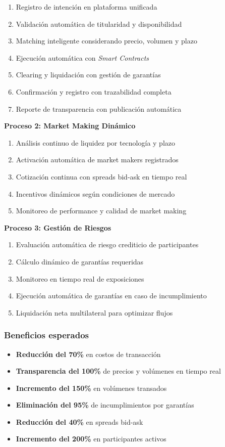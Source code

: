 \documentclass{cel}
\begin{document}
\begin{enumerate}
\item Registro de intención en plataforma unificada
\item Validación automática de titularidad y disponibilidad
\item Matching inteligente considerando precio, volumen y plazo
\item Ejecución automática con \textit{Smart Contracts}
\item Clearing y liquidación con gestión de garantías
\item Confirmación y registro con trazabilidad completa
\item Reporte de transparencia con publicación automática

\end{enumerate}
\textbf{Proceso 2: Market Making Dinámico}


\begin{enumerate}
\item Análisis continuo de liquidez por tecnología y plazo
\item Activación automática de market makers registrados
\item Cotización continua con spreads bid-ask en tiempo real
\item Incentivos dinámicos según condiciones de mercado
\item Monitoreo de performance y calidad de market making

\end{enumerate}
\textbf{Proceso 3: Gestión de Riesgos}


\begin{enumerate}
\item Evaluación automática de riesgo crediticio de participantes
\item Cálculo dinámico de garantías requeridas
\item Monitoreo en tiempo real de exposiciones
\item Ejecución automática de garantías en caso de incumplimiento
\item Liquidación neta multilateral para optimizar flujos

\end{enumerate}
\subsubsection{Beneficios esperados}
\nopagebreak

\begin{itemize}
\item \textbf{Reducción del 70\%} en costos de transacción
\item \textbf{Transparencia del 100\%} de precios y volúmenes en tiempo real
\item \textbf{Incremento del 150\%} en volúmenes transados
\item \textbf{Eliminación del 95\%} de incumplimientos por garantías
\item \textbf{Reducción del 40\%} en spreads bid-ask
\item \textbf{Incremento del 200\%} en participantes activos

\end{itemize}
\end{document}
